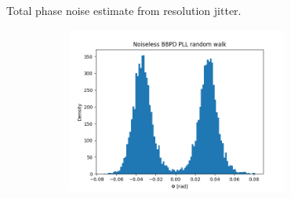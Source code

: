 \documentclass[t, screen, aspectratio=43]{beamer}
\begin{document}
\begin{frame}
\begin{block}{Total phase noise estimate from resolution jitter.}
\begin{figure}[htb!]
\begin{subfigure}{0.5\textwidth}
	        \centering
	        \center\includegraphics[width=0.8\textwidth, angle=0]{bbpd_rw_hist}
	    \end{subfigure}
	\end{figure}

	\end{block}	
\end{frame}
\end{document}
